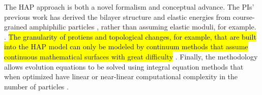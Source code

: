The HAP approach is both a novel formalism and conceptual advance.
The PIs' previous work has derived the bilayer structure
and elastic energies from course-grained amphiphilic particles
\cite{Fu2018_SIAM,FuQuRyYo20}, rather than assuming
elastic moduli, for example.
\cite{Hamm2000,TerziDeserno17, PhysRevE.102.042406}.
\hl{The granularity of protiens and topological changes, for example,
that are built into the HAP model can only be modeled by
continuum methods that assume continuous mathematical surfaces
with great difficulty}
\cite{DuLiuWang2004_JCP,BibenKassnerMisbah2005_PRE,DoyeuxGuyotChabannesEtAl2013_JCAM, Shravan09,Rahimian15,KimLai2010_JCP,KimLai2012_PRE,HuLaiSeolEtAl2016_JCP,Bartels,Peng13,RyKlYaCo16,Sinha15, Du05,QiangDu08,Lowengrub13, Hu,Hu13, KimLai2010_JCP,doi:10.1063/5.0009734, LiAn-Chang16,doi:10.1098/rspa.2012.0505, doi:10.1137/130941432, Feetzl18,doi:10.1137/16M1108406}.
Finally, the methodology allows
evolution equations to be solved
using integral equation methods that when optimized have
linear or near-linear computational complexity in the number of particles 
\cite{fmm1, fmm2, fmm3, fmm4, fmm5, fmm6, fmm7, fmm8}.

